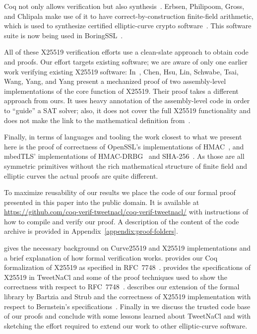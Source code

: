 Coq not only allows verification but also synthesis~\cite{CpdtJFR}.
Erbsen, Philipoom, Gross, and Chlipala make use of it to have
correct-by-construction finite-field arithmetic, which is used
to synthesize certified elliptic-curve crypto software~\cite{Philipoom2018CorrectbyconstructionFF,Erbsen2017CraftingCE,Erbsen2016SystematicSO}.
This software suite is now being used in BoringSSL~\cite{fiat-crypto}.

All of these X25519 verification efforts use a clean-slate approach to obtain code and proofs.
Our effort targets existing software; we are aware of only one earlier work verifying existing X25519 software:
In~\cite{Chen2014VerifyingCS}, Chen, Hsu, Lin, Schwabe, Tsai, Wang, Yang, and Yang present
a mechanized proof of two assembly-level implementations of the core function of X25519.
Their proof takes a different approach from ours.
It uses heavy annotation of the assembly-level code in order to ``guide'' a SAT solver;
also, it does not cover the full X25519 functionality and does
not make the link to the mathematical definition from~\cite{Ber06}.

Finally, in terms of languages and tooling the work closest to what we present here
is the proof of correctness of OpenSSL's
implementations of HMAC~\cite{Beringer2015VerifiedCA},
and mbedTLS' implementations of
HMAC-DRBG~\cite{2017-Ye} and SHA-256~\cite{2015-Appel}.
As those are all symmetric primitives without the rich mathematical
structure of finite field and elliptic curves the actual proofs are quite different.

To maximize reusability of our results we place the code of our formal proof
presented in this paper into the public domain.
It is available at \url{https://github.com/coq-verif-tweetnacl/coq-verif-tweetnacl/}
with instructions of how to compile and verify our proof.
A description of the content of the code archive is provided in
Appendix~\ref{appendix:proof-folders}.

 gives the necessary background on Curve25519 and X25519
implementations and a brief explanation of how formal verification works.
 provides our Coq formalization of X25519 as specified in RFC~7748~\cite{rfc7748}.
 provides the specifications of X25519 in TweetNaCl and some of the
proof techniques used to show the correctness with respect to RFC~7748~\cite{rfc7748}.
 describes our extension of the formal library by Bartzia
and Strub and the correctness of X25519 implementation with respect to Bernstein's
specifications~\cite{Ber14}.
Finally in  we discuss the trusted code base of our proofs
and conclude with some lessons learned about TweetNaCl and with sketching the
effort required to extend our work to other elliptic-curve software.

